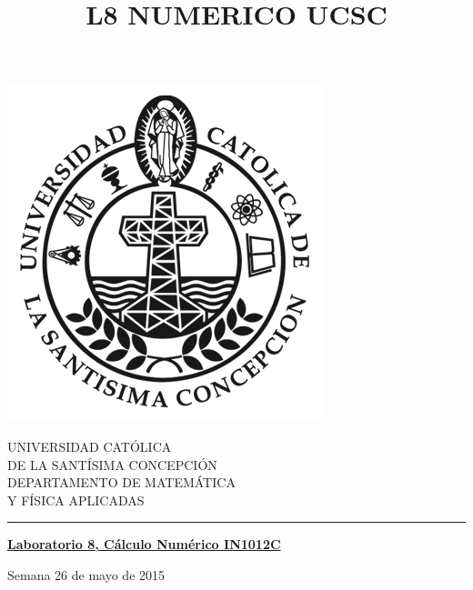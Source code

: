 \documentclass[11pt]{article}
\begin{document}
\title{L8 NUMERICO UCSC}

\begin{minipage}{0.15\textwidth}
\includegraphics[width=\textwidth]{ucsc.png}
\end{minipage}
\begin{minipage}{0.9\textwidth}
{UNIVERSIDAD CAT\'OLICA}\\ 
{DE LA SANT\'ISIMA CONCEPCI\'ON}\\
{DEPARTAMENTO DE MATEM\'ATICA}\\ 
{ Y F\'ISICA APLICADAS}\\
\rule{0.66\textwidth}{.5pt} %
\end{minipage}

\vspace*{0.5cm} \centerline {\bf\underline{Laboratorio 8, C\'alculo Num\'erico  IN1012C }}
\centerline{\textrm{Semana 26 de mayo de 2015}}  \vspace{0.2cm}




\end{document}
